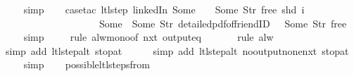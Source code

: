 \begin{isabellebody}
\ \ \ \isamarkupfalse%
\ simp\isanewline
\ \ \isamarkupfalse%
\ {\isacharparenleft}case{\isacharunderscore}tac\ {\isachardoublequoteopen}ltl{\isacharunderscore}step\ linkedIn\ {\isacharparenleft}Some\ {}{\isacharparenright}\ {\isacharparenleft}{\isacharless}{\isachargreater}{\isacharparenleft}{}\ {\isachardollar}{\isacharcolon}{\isacharequal}\ Some\ {\isacharparenleft}Str\ {\isacharprime}{\isacharprime}free{\isacharprime}{\isacharprime}{\isacharparenright}{\isacharparenright}{\isacharparenright}\ {\isacharparenleft}shd\ i{\isacharparenright}\ {\isacharequal}\ \isanewline
\ \ \ \ \ \ \ \ \ \ \ \ \ \ \ \ \ \ \ \ {\isacharparenleft}Some\ {}{\isacharcomma}\ {\isacharbrackleft}Some\ {\isacharparenleft}Str\ {\isacharprime}{\isacharprime}detailed{\isacharunderscore}pdf{\isacharunderscore}of{\isacharunderscore}friendID{\isacharprime}{\isacharprime}{\isacharparenright}{\isacharbrackright}{\isacharcomma}\ {\isacharparenleft}{\isacharless}{\isachargreater}{\isacharparenleft}{}\ {\isachardollar}{\isacharcolon}{\isacharequal}\ Some\ {\isacharparenleft}Str\ {\isacharprime}{\isacharprime}free{\isacharprime}{\isacharprime}{\isacharparenright}{\isacharparenright}{\isacharparenright}{\isacharparenright}{\isachardoublequoteclose}{\isacharparenright}\isanewline
\ \ \ \isamarkupfalse%
\ simp\isanewline
\ \ \ \isamarkupfalse%
\ {\isacharparenleft}rule\ alw{\isacharunderscore}mono{\isacharbrackleft}of\ {\isachardoublequoteopen}nxt\ {\isacharparenleft}output{\isacharunderscore}eq\ {\isacharbrackleft}{\isacharbrackright}{\isacharparenright}{\isachardoublequoteclose}{\isacharbrackright}{\isacharparenright}\isanewline
\ \ \ \ \isamarkupfalse%
\ {\isacharparenleft}rule\ alw{\isacharparenright}\isanewline
\ \ \ \ \ \isamarkupfalse%
\ {\isacharparenleft}simp\ add{\isacharcolon}\ ltl{\isacharunderscore}step{\isacharunderscore}alt\ stop{\isacharunderscore}at{\isacharunderscore}{}{\isacharparenright}\isanewline
\ \ \ \ \isamarkupfalse%
\ {\isacharparenleft}simp\ add{\isacharcolon}\ ltl{\isacharunderscore}step{\isacharunderscore}alt\ no{\isacharunderscore}output{\isacharunderscore}none{\isacharunderscore}nxt\ stop{\isacharunderscore}at{\isacharunderscore}{}{\isacharparenright}\isanewline
\ \ \ \isamarkupfalse%
\ simp\isanewline
\ \ \isamarkupfalse%
\ possible{\isacharunderscore}ltl{\isacharunderscore}steps{\isacharunderscore}from{\isacharunderscore}{}\ \isamarkupfalse%

\end{isabellebody}
